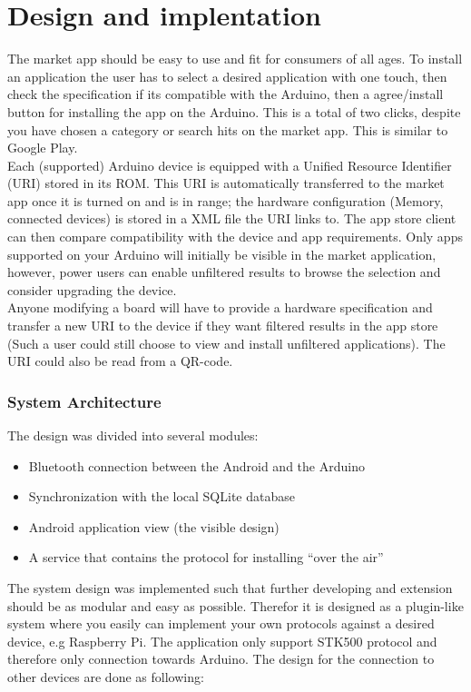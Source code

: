 \chapter{Design and implentation}
The market app should be easy to use and fit for consumers of all ages. To install an application the user has to select a desired application with one touch, then check the specification if its compatible with the Arduino, then a agree/install button for installing the app on the Arduino. This is a total of two clicks, despite you have chosen a category or search hits on the market app. This is similar to Google Play.\\
\newline
Each (supported) Arduino device is equipped with a Unified Resource Identifier (URI) stored in its ROM. This URI is automatically transferred to the market app once it is turned on and is in range; the hardware configuration (Memory, connected devices) is stored in a XML file the URI links to.
The app store client can then compare compatibility with the device and app requirements.
Only apps supported on your Arduino will initially be visible in the market application, however, power users can enable unfiltered results to browse the selection and consider upgrading the device.\\
\newline
Anyone modifying a board will have to provide a hardware specification and transfer a new URI to the device if they want filtered results in the app store (Such a user could still choose to view and install unfiltered applications).
The URI could also be read from a QR-code.

\subsection{System Architecture}
	The design was divided into several modules:
	\begin{itemize}
		\item{Bluetooth connection between the Android and the Arduino}
		\item{Synchronization with the local SQLite database}
		\item{Android application view (the visible design)}
		\item{A service that contains the protocol for installing ``over the air''}
	\end{itemize}
	\vspace{0.2in}
	
	The system design was implemented such that further developing and extension should be as modular and easy as possible.
	Therefor it is designed as a plugin-like system where you easily can implement your own protocols against a desired device, e.g Raspberry Pi. The application only support STK500 protocol and therefore only connection towards Arduino.
	The design for the connection to other devices are done as following:\\


